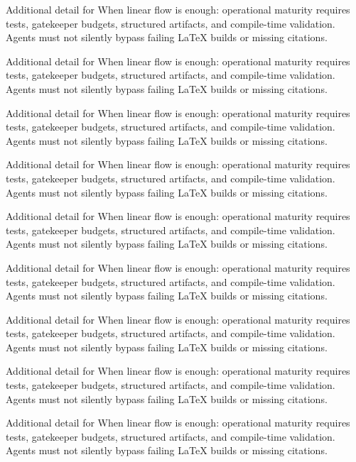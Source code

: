 Additional detail for When linear flow is enough: operational maturity requires tests, gatekeeper budgets, structured artifacts, and compile-time validation. Agents must not silently bypass failing LaTeX builds or missing citations. \cite{crewai2024} \cite{langgraph2024}

Additional detail for When linear flow is enough: operational maturity requires tests, gatekeeper budgets, structured artifacts, and compile-time validation. Agents must not silently bypass failing LaTeX builds or missing citations. \cite{crewai2024} \cite{langgraph2024}

Additional detail for When linear flow is enough: operational maturity requires tests, gatekeeper budgets, structured artifacts, and compile-time validation. Agents must not silently bypass failing LaTeX builds or missing citations. \cite{crewai2024} \cite{langgraph2024}

Additional detail for When linear flow is enough: operational maturity requires tests, gatekeeper budgets, structured artifacts, and compile-time validation. Agents must not silently bypass failing LaTeX builds or missing citations. \cite{crewai2024} \cite{langgraph2024}

Additional detail for When linear flow is enough: operational maturity requires tests, gatekeeper budgets, structured artifacts, and compile-time validation. Agents must not silently bypass failing LaTeX builds or missing citations. \cite{crewai2024} \cite{langgraph2024}

Additional detail for When linear flow is enough: operational maturity requires tests, gatekeeper budgets, structured artifacts, and compile-time validation. Agents must not silently bypass failing LaTeX builds or missing citations. \cite{crewai2024} \cite{langgraph2024}

Additional detail for When linear flow is enough: operational maturity requires tests, gatekeeper budgets, structured artifacts, and compile-time validation. Agents must not silently bypass failing LaTeX builds or missing citations. \cite{crewai2024} \cite{langgraph2024}

Additional detail for When linear flow is enough: operational maturity requires tests, gatekeeper budgets, structured artifacts, and compile-time validation. Agents must not silently bypass failing LaTeX builds or missing citations. \cite{crewai2024} \cite{langgraph2024}

Additional detail for When linear flow is enough: operational maturity requires tests, gatekeeper budgets, structured artifacts, and compile-time validation. Agents must not silently bypass failing LaTeX builds or missing citations. \cite{crewai2024} \cite{langgraph2024}


